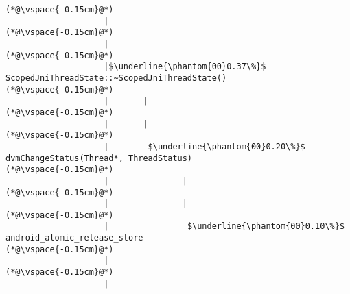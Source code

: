 \begin{lstlisting}[caption=20 viiteparametria (C$\to$Java) , label=profile:C2JBenchmark00206, numberbychapter=true, frame=lines, float, floatplacement=t]
(*@\vspace{-0.15cm}@*)
                    |
(*@\vspace{-0.15cm}@*)
                    |
(*@\vspace{-0.15cm}@*)
                    |$\underline{\phantom{00}0.37\%}$ ScopedJniThreadState::~ScopedJniThreadState()
(*@\vspace{-0.15cm}@*)
                    |       |
(*@\vspace{-0.15cm}@*)
                    |       |
(*@\vspace{-0.15cm}@*)
                    |        $\underline{\phantom{00}0.20\%}$ dvmChangeStatus(Thread*, ThreadStatus)
(*@\vspace{-0.15cm}@*)
                    |               |
(*@\vspace{-0.15cm}@*)
                    |               |
(*@\vspace{-0.15cm}@*)
                    |                $\underline{\phantom{00}0.10\%}$ android_atomic_release_store
(*@\vspace{-0.15cm}@*)
                    |
(*@\vspace{-0.15cm}@*)
                    |

\end{lstlisting}

